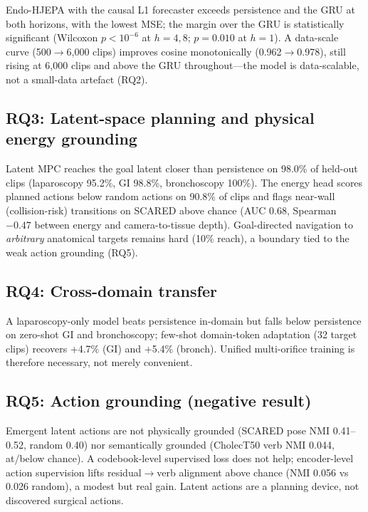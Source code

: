 \documentclass[final,3p,times,twocolumn]{elsarticle}
\begin{document}
Endo-HJEPA with the causal L1 forecaster exceeds persistence and the GRU at both horizons, with the lowest MSE; the margin over the GRU is statistically significant (Wilcoxon $p<10^{-6}$ at $h{=}4,8$; $p{=}0.010$ at $h{=}1$). A data-scale curve (500$\to$6,000 clips) improves cosine monotonically (0.962$\to$0.978), still rising at 6,000 clips and above the GRU throughout---the model is data-scalable, not a small-data artefact (RQ2).

\subsection{RQ3: Latent-space planning and physical energy grounding}
Latent MPC reaches the goal latent closer than persistence on 98.0\% of held-out clips (laparoscopy 95.2\%, GI 98.8\%, bronchoscopy 100\%). The energy head scores planned actions below random actions on 90.8\% of clips and flags near-wall (collision-risk) transitions on SCARED above chance (AUC 0.68, Spearman $-0.47$ between energy and camera-to-tissue depth). Goal-directed navigation to \emph{arbitrary} anatomical targets remains hard (10\% reach), a boundary tied to the weak action grounding (RQ5).

\subsection{RQ4: Cross-domain transfer}
A laparoscopy-only model beats persistence in-domain but falls below persistence on zero-shot GI and bronchoscopy; few-shot domain-token adaptation (32 target clips) recovers +4.7\% (GI) and +5.4\% (bronch). Unified multi-orifice training is therefore necessary, not merely convenient.

\subsection{RQ5: Action grounding (negative result)}
Emergent latent actions are not physically grounded (SCARED pose NMI 0.41--0.52, random 0.40) nor semantically grounded (CholecT50 verb NMI 0.044, at/below chance). A codebook-level supervised loss does not help; encoder-level action supervision lifts residual$\to$verb alignment above chance (NMI 0.056 vs 0.026 random), a modest but real gain. Latent actions are a planning device, not discovered surgical actions.
\end{document}
